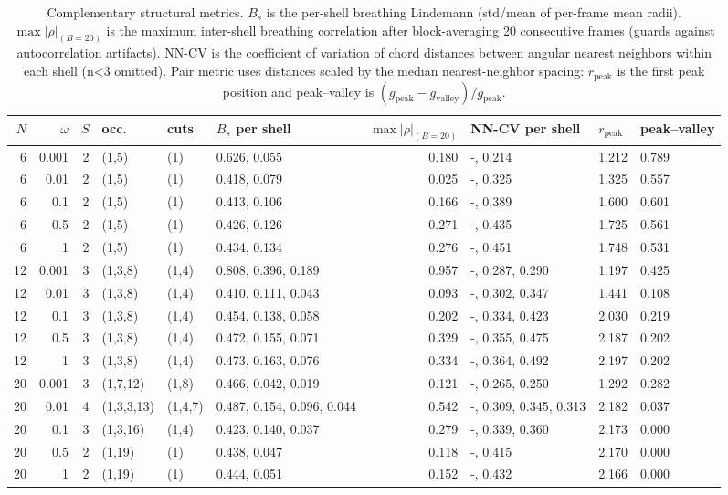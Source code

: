 \begin{table}[t]
\centering
\small
\setlength{\tabcolsep}{3.5pt}
\renewcommand{\arraystretch}{1.15}
\begin{adjustbox}{max width=\textwidth}
\begin{tabular}{rrrlllrlll}
\toprule
$N$ & $\omega$ & $S$ & occ. & cuts & $B_s$ per shell & $\max|\rho|_{(B=20)}$ & NN-CV per shell & $r_{\mathrm{peak}}$ & peak--valley \\
\midrule
6 & 0.001 & 2 & (1,5) & (1) & 0.626, 0.055 & 0.180 & -, 0.214 & 1.212 & 0.789 \\
6 & 0.01 & 2 & (1,5) & (1) & 0.418, 0.079 & 0.025 & -, 0.325 & 1.325 & 0.557 \\
6 & 0.1 & 2 & (1,5) & (1) & 0.413, 0.106 & 0.166 & -, 0.389 & 1.600 & 0.601 \\
6 & 0.5 & 2 & (1,5) & (1) & 0.426, 0.126 & 0.271 & -, 0.435 & 1.725 & 0.561 \\
6 & 1 & 2 & (1,5) & (1) & 0.434, 0.134 & 0.276 & -, 0.451 & 1.748 & 0.531 \\
12 & 0.001 & 3 & (1,3,8) & (1,4) & 0.808, 0.396, 0.189 & 0.957 & -, 0.287, 0.290 & 1.197 & 0.425 \\
12 & 0.01 & 3 & (1,3,8) & (1,4) & 0.410, 0.111, 0.043 & 0.093 & -, 0.302, 0.347 & 1.441 & 0.108 \\
12 & 0.1 & 3 & (1,3,8) & (1,4) & 0.454, 0.138, 0.058 & 0.202 & -, 0.334, 0.423 & 2.030 & 0.219 \\
12 & 0.5 & 3 & (1,3,8) & (1,4) & 0.472, 0.155, 0.071 & 0.329 & -, 0.355, 0.475 & 2.187 & 0.202 \\
12 & 1 & 3 & (1,3,8) & (1,4) & 0.473, 0.163, 0.076 & 0.334 & -, 0.364, 0.492 & 2.197 & 0.202 \\
20 & 0.001 & 3 & (1,7,12) & (1,8) & 0.466, 0.042, 0.019 & 0.121 & -, 0.265, 0.250 & 1.292 & 0.282 \\
20 & 0.01 & 4 & (1,3,3,13) & (1,4,7) & 0.487, 0.154, 0.096, 0.044 & 0.542 & -, 0.309, 0.345, 0.313 & 2.182 & 0.037 \\
20 & 0.1 & 3 & (1,3,16) & (1,4) & 0.423, 0.140, 0.037 & 0.279 & -, 0.339, 0.360 & 2.173 & 0.000 \\
20 & 0.5 & 2 & (1,19) & (1) & 0.438, 0.047 & 0.118 & -, 0.415 & 2.170 & 0.000 \\
20 & 1 & 2 & (1,19) & (1) & 0.444, 0.051 & 0.152 & -, 0.432 & 2.166 & 0.000 \\
\bottomrule
\end{tabular}
\end{adjustbox}
\caption{Complementary structural metrics. $B_s$ is the per-shell breathing Lindemann (std/mean of per-frame mean radii). $\max|\rho|_{(B=20)}$ is the maximum inter-shell breathing correlation after block-averaging 20 consecutive frames (guards against autocorrelation artifacts). NN-CV is the coefficient of variation of chord distances between angular nearest neighbors within each shell (n<3 omitted). Pair metric uses distances scaled by the median nearest-neighbor spacing: $r_{\mathrm{peak}}$ is the first peak position and peak--valley is $(g_{\mathrm{peak}}-g_{\mathrm{valley}})/g_{\mathrm{peak}}$.}
\label{tab:shell_complement}
\end{table}